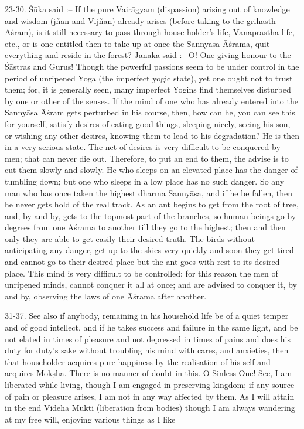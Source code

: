 23-30. \'S\=uka said :-- If the pure Vair\=agyam (dispassion) arising out of knowledge and wisdom (j\~n\=an and Vij\~n\=an) already arises (before taking to the grihasth \=A\'sram), is it still necessary to pass through house holder's life, V\=anaprastha life, etc., or is one entitled then to take up at once the Sanny\=asa \=A\'srama, quit everything and reside in the forest? Janaka said :-- O! One giving honour to the \'S\=astras and Gurus! Though the powerful passions seem to be under control in the period of unripened Yoga (the imperfect yogic state), yet one ought not to trust them; for, it is generally seen, many imperfect Yogins find themselves disturbed by one or other of the senses. If the mind of one who has already entered into the Sanny\=asa \=A\'sram gets perturbed in his course, then, how can he, you can see this for yourself, satisfy desires of eating good things, sleeping nicely, seeing his son, or wishing any other desires, knowing them to lead to his degradation? He is then in a very serious state. The net of desires is very difficult to be conquered by men; that can never die out. Therefore, to put an end to them, the advise is to cut them slowly and slowly. He who sleeps on an elevated place has the danger of tumbling down; but one who sleeps in a low place has no such danger. So any man who has once taken the highest dharma Sanny\=asa, and if he be fallen, then he never gets hold of the real track. As an ant begins to get from the root of tree, and, by and by, gets to the topmost part of the branches, so human beings go by degrees from one \=A\'srama to another till they go to the highest; then and then only they are able to get easily their desired truth. The birds without anticipating any danger, get up to the skies very quickly and soon they get tired and cannot go to their desired place but the ant goes with rest to its desired place. This mind is very difficult to be controlled; for this reason the men of unripened minds, cannot conquer it all at once; and are advised to conquer it, by and by, observing the laws of one \=A\'srama after another.

31-37. See also if anybody, remaining in his household life be of a quiet temper and of good intellect, and if he takes success and failure in the same light, and be not elated in times of pleasure and not depressed in times of pains and does his duty for duty's sake without troubling his mind with cares, and anxieties, then that householder acquires pure happiness by the realisation of his self and acquires Mok\d{s}ha. There is no manner of doubt in this. O Sinless One! See, I am liberated while living, though I am engaged in preserving kingdom; if any source of pain or pleasure arises, I am not in any way affected by them. As I will attain in the end Videha Mukti (liberation from bodies) though I am always wandering at my free will, enjoying various things as I like

